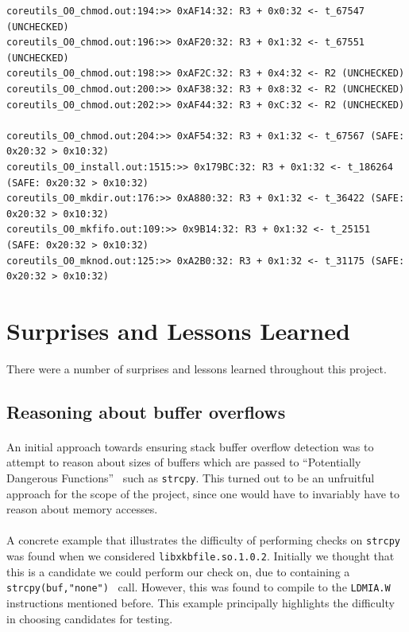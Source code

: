 \documentclass[letterpaper,11pt]{article}
\begin{document}
\small
\begin{verbatim}
coreutils_O0_chmod.out:194:>> 0xAF14:32: R3 + 0x0:32 <- t_67547 (UNCHECKED)
coreutils_O0_chmod.out:196:>> 0xAF20:32: R3 + 0x1:32 <- t_67551 (UNCHECKED)
coreutils_O0_chmod.out:198:>> 0xAF2C:32: R3 + 0x4:32 <- R2 (UNCHECKED)
coreutils_O0_chmod.out:200:>> 0xAF38:32: R3 + 0x8:32 <- R2 (UNCHECKED)
coreutils_O0_chmod.out:202:>> 0xAF44:32: R3 + 0xC:32 <- R2 (UNCHECKED)

coreutils_O0_chmod.out:204:>> 0xAF54:32: R3 + 0x1:32 <- t_67567 (SAFE: 0x20:32 > 0x10:32)
coreutils_O0_install.out:1515:>> 0x179BC:32: R3 + 0x1:32 <- t_186264 (SAFE: 0x20:32 > 0x10:32)
coreutils_O0_mkdir.out:176:>> 0xA880:32: R3 + 0x1:32 <- t_36422 (SAFE: 0x20:32 > 0x10:32)
coreutils_O0_mkfifo.out:109:>> 0x9B14:32: R3 + 0x1:32 <- t_25151 (SAFE: 0x20:32 > 0x10:32)
coreutils_O0_mknod.out:125:>> 0xA2B0:32: R3 + 0x1:32 <- t_31175 (SAFE: 0x20:32 > 0x10:32)
\end{verbatim}
\normalsize

\section{Surprises and Lessons Learned}
\label{lessonslearned}

There were a number of surprises and lessons learned throughout this project.

\subsection{Reasoning about buffer overflows}

\paragraph{}
An initial approach towards ensuring stack buffer overflow detection was to
attempt to reason about sizes of buffers which are passed to ``Potentially
Dangerous Functions''~\cite{seacord2008cert} such as \texttt{strcpy}. This
turned out to be an unfruitful approach for the scope of the project, since one
would have to invariably have to reason about memory accesses.

\paragraph{}
A concrete example that illustrates the difficulty of performing checks on
\texttt{strcpy} was found when we considered \texttt{libxkbfile.so.1.0.2}.
Initially we thought that this is a candidate we could perform our check on,
due to containing a \texttt{strcpy(buf,"none")}~\cite{xorg} call. However, this was found
to compile to the \texttt{LDMIA.W} instructions mentioned before. This example
principally highlights the difficulty in choosing candidates for testing.
\end{document}
